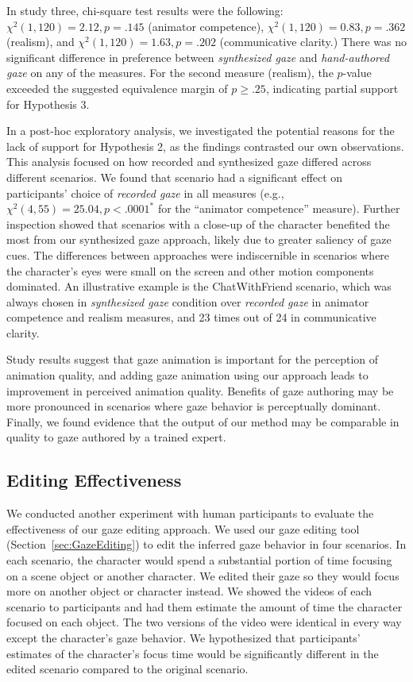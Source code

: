 In study three, chi-square test results were the following: $\chi^2(1, 120) = 2.12, p = .145$ (animator competence), $\chi^2(1, 120) = 0.83, p = .362$ (realism), and $\chi^2(1, 120) = 1.63, p = .202$ (communicative clarity.) There was no significant difference in preference between \emph{synthesized gaze} and \emph{hand-authored gaze} on any of the measures. For the second measure (realism), the $p$-value exceeded the suggested equivalence margin of $p \geq .25$, indicating partial support for Hypothesis 3.

In a post-hoc exploratory analysis, we investigated the potential reasons for the lack of support for Hypothesis 2, as the findings contrasted our own observations. This analysis focused on how recorded and synthesized gaze differed across different scenarios. We found that scenario had a significant effect on participants' choice of \emph{recorded gaze} in all measures (e.g., $\chi^2(4, 55) = 25.04, p < .0001^*$ for the ``animator competence'' measure). Further inspection showed that scenarios with a close-up of the character benefited the most from our synthesized gaze approach, likely due to greater saliency of gaze cues. The differences between approaches were indiscernible in scenarios where the character's eyes were small on the screen and other motion components dominated. An illustrative example is the ChatWithFriend scenario, which was always chosen in \emph{synthesized gaze} condition over \emph{recorded gaze} in animator competence and realism measures, and 23 times out of 24 in communicative clarity.

Study results suggest that gaze animation is important for the perception of animation quality, and adding gaze animation using our approach leads to improvement in perceived animation quality. Benefits of gaze authoring may be more pronounced in scenarios where gaze behavior is perceptually dominant. Finally, we found evidence that the output of our method may be comparable in quality to gaze authored by a trained expert.

\subsection{Editing Effectiveness}
\label{sec:GazeEditingEffectEvaluation}

We conducted another experiment with human participants to evaluate the effectiveness of our gaze editing approach. We used our gaze editing tool (Section~\ref{sec:GazeEditing}) to edit the inferred gaze behavior in four scenarios. In each scenario, the character would spend a substantial portion of time focusing on a scene object or another character. We edited their gaze so they would focus more on another object or character instead. We showed the videos of each scenario to participants and had them estimate the amount of time the character focused on each object. The two versions of the video were identical in every way except the character's gaze behavior. We hypothesized that participants' estimates of the character's focus time would be significantly different in the edited scenario compared to the original scenario.

